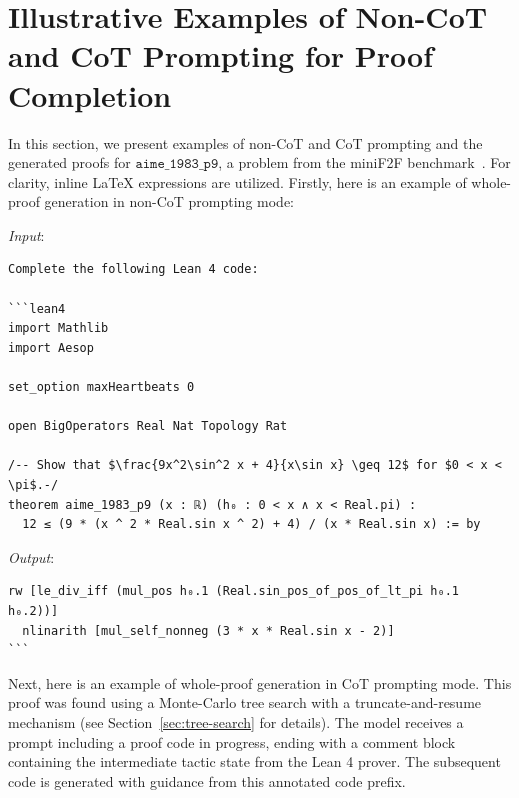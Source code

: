 \section{\large Illustrative Examples of Non-CoT and CoT Prompting for Proof Completion}
\label{app:promt_examples}

In this section, we present examples of non-CoT and CoT prompting and the generated proofs for $\mathtt{aime\_1983\_p9}$, a problem from the miniF2F benchmark~\citep{zheng2021minif2f}. For clarity, inline LaTeX expressions are utilized. Firstly, here is an example of whole-proof generation in non-CoT prompting mode:

\noindent \textit{Input}:
\begin{lstlisting}[frame=single]
Complete the following Lean 4 code:

```lean4
import Mathlib
import Aesop

set_option maxHeartbeats 0

open BigOperators Real Nat Topology Rat

/-- Show that $\frac{9x^2\sin^2 x + 4}{x\sin x} \geq 12$ for $0 < x < \pi$.-/
theorem aime_1983_p9 (x : ℝ) (h₀ : 0 < x ∧ x < Real.pi) :
  12 ≤ (9 * (x ^ 2 * Real.sin x ^ 2) + 4) / (x * Real.sin x) := by
\end{lstlisting}
\noindent \textit{Output}:
\begin{lstlisting}[frame=single]
  rw [le_div_iff (mul_pos h₀.1 (Real.sin_pos_of_pos_of_lt_pi h₀.1 h₀.2))]
  nlinarith [mul_self_nonneg (3 * x * Real.sin x - 2)]
```
\end{lstlisting}

Next, here is an example of whole-proof generation in CoT prompting mode. This proof was found using a Monte-Carlo tree search with a truncate-and-resume mechanism (see Section~\ref{sec:tree-search} for details). The model receives a prompt including a proof code in progress, ending with a comment block containing the intermediate tactic state from the Lean 4 prover. The subsequent code is generated with guidance from this annotated code prefix.


